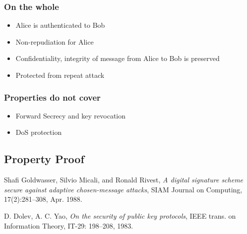 \documentclass[10pt,a4paper]{article}
\begin{document}
\subsubsection*{On the whole}
\begin{itemize}
\item Alice is authenticated to Bob
\item Non-repudiation for Alice
\item Confidentiality, integrity of message from Alice to Bob is preserved
\item Protected from repeat attack
\end{itemize}

\subsubsection*{Properties do not cover}
\begin{itemize}
\item Forward Secrecy and key revocation
\item DoS protection
\end{itemize}

\subsection*{Property Proof}

\begin{thebibliography}{9}
  Shafi Goldwasser, Silvio Micali, and Ronald Rivest,
  \emph{A digital signature scheme secure against adaptive chosen-message attacks},  SIAM Journal on Computing,
  17(2):281–308,
  Apr. 1988.
  
  D. Dolev, A. C. Yao,
  \emph{On the security of public key protocols},
  IEEE trans. on Information Theory,
  IT-29: 198–208,
  1983.
\end{thebibliography}
\end{document}
